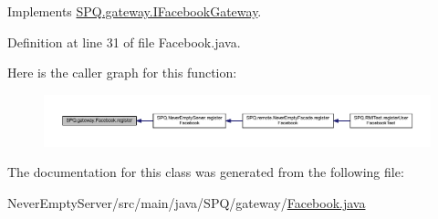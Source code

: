 Implements \mbox{\hyperlink{interface_s_p_q_1_1gateway_1_1_i_facebook_gateway_adeef42315d68dc80ddf79bf4e1cbdeb0}{S\+P\+Q.\+gateway.\+I\+Facebook\+Gateway}}.



Definition at line 31 of file Facebook.\+java.

Here is the caller graph for this function\+:\nopagebreak
\begin{figure}[H]
\begin{center}
\leavevmode
\includegraphics[width=350pt]{class_s_p_q_1_1gateway_1_1_facebook_aba03bc89c530d3f2159b3a1eb65c3427_icgraph}
\end{center}
\end{figure}


The documentation for this class was generated from the following file\+:\begin{DoxyCompactItemize}
\item 
Never\+Empty\+Server/src/main/java/\+S\+P\+Q/gateway/\mbox{\hyperlink{_facebook_8java}{Facebook.\+java}}\end{DoxyCompactItemize}

